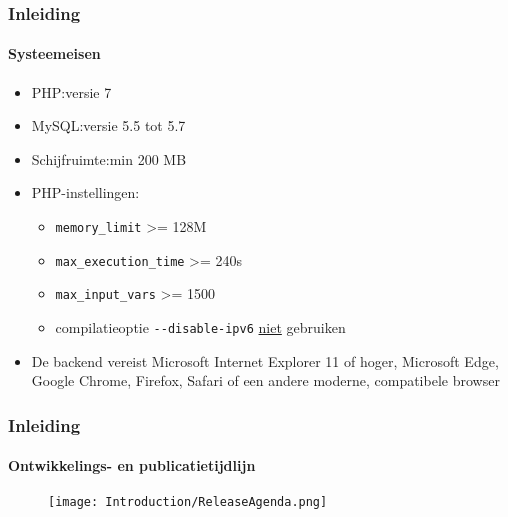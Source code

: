 \begin{frame}[fragile]
	\frametitle{Inleiding}
	\framesubtitle{Systeemeisen}

	\begin{itemize}
		\item PHP:\tabto{2.2cm}versie 7
		\item MySQL:\tabto{2.2cm}versie 5.5 tot 5.7
		\item Schijfruimte:\tabto{2.2cm}min 200 MB
		\item PHP-instellingen:

			\begin{itemize}
				\item \texttt{memory\_limit} >= 128M
				\item \texttt{max\_execution\_time} >= 240s
				\item \texttt{max\_input\_vars} >= 1500
				\item compilatieoptie \texttt{-}\texttt{-disable-ipv6} \underline{niet} gebruiken
			\end{itemize}

		\item De backend vereist Microsoft Internet Explorer 11 of hoger,
			Microsoft Edge, Google Chrome, Firefox, Safari
			of een andere moderne, compatibele browser

	\end{itemize}

\end{frame}

\begin{frame}[fragile]
	\frametitle{Inleiding}
	\framesubtitle{Ontwikkelings- en publicatietijdlijn}

	\begin{figure}
		\texttt{[image: Introduction/ReleaseAgenda.png]}
	\end{figure}

\end{frame}

